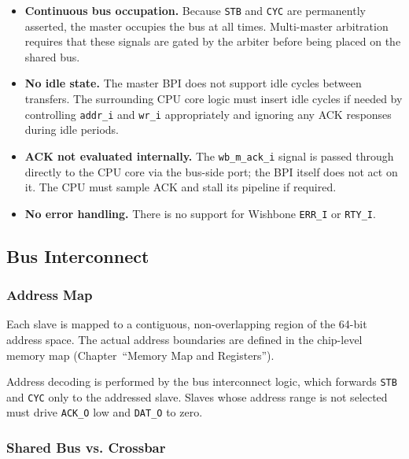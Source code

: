 \begin{itemize}
  \item \textbf{Continuous bus occupation.}
    Because \texttt{STB} and \texttt{CYC} are permanently asserted,
    the master occupies the bus at all times.
    Multi-master arbitration requires that these signals are gated
    by the arbiter before being placed on the shared bus.
  \item \textbf{No idle state.}
    The master BPI does not support idle cycles between transfers.
    The surrounding CPU core logic must insert idle cycles if needed
    by controlling \texttt{addr\_i} and \texttt{wr\_i} appropriately and
    ignoring any ACK responses during idle periods.
  \item \textbf{ACK not evaluated internally.}
    The \texttt{wb\_m\_ack\_i} signal is passed through directly to the
    CPU core via the bus-side port; the BPI itself does not act on it.
    The CPU must sample ACK and stall its pipeline if required.
  \item \textbf{No error handling.}
    There is no support for Wishbone \texttt{ERR\_I} or \texttt{RTY\_I}.
\end{itemize}


\subsection{Bus Interconnect}
\label{subsec:asBusInterconnect}

\subsubsection{Address Map}

Each slave is mapped to a contiguous, non-overlapping region of the
64-bit address space.
The actual address boundaries are defined in the chip-level memory map
(Chapter~``Memory Map and Registers'').

Address decoding is performed by the bus interconnect logic, which
forwards \texttt{STB} and \texttt{CYC} only to the addressed slave.
Slaves whose address range is not selected must drive \texttt{ACK\_O}
low and \texttt{DAT\_O} to zero.

\subsubsection{Shared Bus vs. Crossbar}

